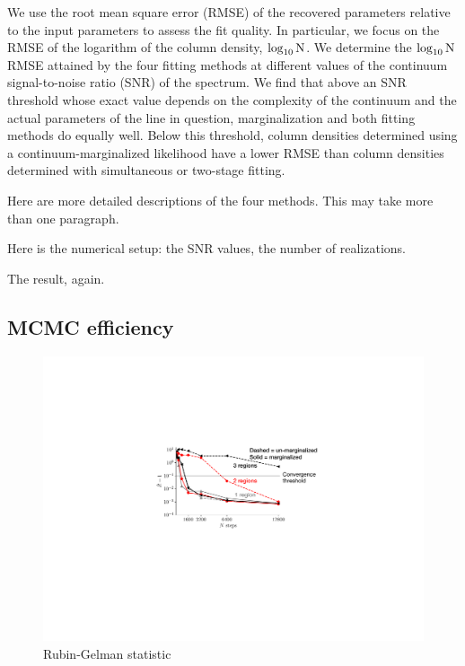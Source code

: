 \documentclass[manuscript]{aastex62}
\begin{document}
We use the root mean square error (RMSE) of the recovered parameters relative to the input parameters to assess the fit quality.
In particular, we focus on the RMSE of the logarithm of the column density, $\log_{10}{\rm N}$.
We determine the $\log_{10}{\rm N}$ RMSE attained by the four fitting methods at different values of the continuum signal-to-noise ratio (SNR) of the spectrum.
We find that above an SNR threshold whose exact value depends on the complexity of the continuum and the actual parameters of the line in question, marginalization and both fitting methods do equally well.
Below this threshold, column densities determined using a continuum-marginalized likelihood have a lower RMSE than column densities determined with simultaneous or two-stage fitting.

Here are more detailed descriptions of the four methods. This may take more than one paragraph.

Here is the numerical setup: the SNR values, the number of realizations.

The result, again.

\subsection{MCMC efficiency}
\label{subsec:multiple-absorption-line-test-case}

\begin{figure}
  \includegraphics{convergence.pdf}
  \caption{Rubin-Gelman statistic}
  \label{fig:convergence-comparison}
\end{figure}
\end{document}
